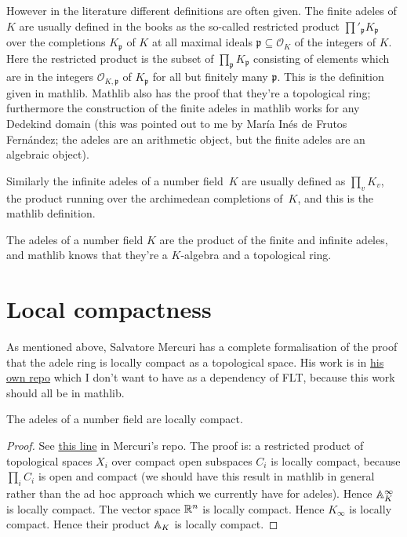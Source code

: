 However in the literature different definitions
are often given. The finite adeles of $K$ are usually defined in the books
as the so-called restricted product $\prod'_{\mathfrak{p}}K_{\mathfrak{p}}$ over the completions
$K_{\mathfrak{p}}$ of $K$ at all maximal ideals $\mathfrak{p}\subseteq\mathcal{O}_K$ of the
integers of $K$. Here the restricted product is the subset of $\prod_{\mathfrak{p}}K_{\mathfrak{p}}$
consisting of elements which are in the integers $\mathcal{O}_{K,\mathfrak{p}}$ of
$K_{\mathfrak{p}}$ for all but finitely many $\mathfrak{p}$. This is the definition given in
mathlib. Mathlib also has the proof that they're a topological ring;
furthermore the construction of the finite adeles in mathlib works for any
Dedekind domain (this was pointed out to me by Mar\'ia In\'es
de Frutos Fern\'andez; the adeles
are an arithmetic object, but the finite adeles are an algebraic object).

Similarly the infinite adeles of a number field~$K$
are usually defined as $\prod_v K_v$,
the product running over the archimedean completions of~$K$, and this is
the mathlib definition.

The adeles of a number field $K$ are the product of the finite and infinite
adeles, and mathlib knows that they're a $K$-algebra and a topological ring.

\section{Local compactness}

As mentioned above, Salvatore Mercuri has a complete formalisation of the proof
that the adele ring is locally compact as a topological space. His work is in
\href{https://github.com/smmercuri/adele-ring_locally-compact}{his own repo} which
I don't want to have as a dependency of FLT, because this work should all be
in mathlib.

\begin{theorem}
  \label{NumberField.AdeleRing.locallyCompactSpace}
  \leanok
  The adeles of a number field are locally compact.
\end{theorem}
\begin{proof}
  See \href{https://github.com/smmercuri/adele-ring_locally-compact/blob/e8e34608c139ee95a1e21d9d24f138524196a2e1/AdeleRingLocallyCompact/NumberTheory/NumberField/AdeleRing.lean#L70}
  {this line} in Mercuri's repo. The proof is: a restricted product of topological spaces $X_i$
  over compact open subspaces $C_i$ is locally compact, because $\prod_i C_i$ is open and compact
  (we should have this result in mathlib in general rather than the ad hoc approach which we
  currently have for adeles).
  Hence $\mathbb{A}_K^\infty$ is locally compact.
  The vector space $\mathbb{R}^n$ is locally compact. Hence $K_{\infty}$ is locally compact.
  Hence their product $\mathbb{A}_K$ is locally compact.
\end{proof}

